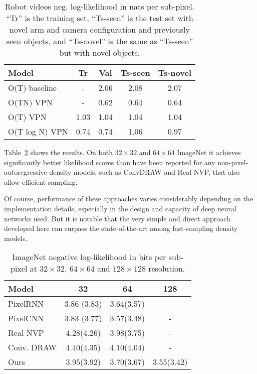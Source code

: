 \documentclass{article}
\begin{document}
\begin{table}[t!]
\begin{center}
\begin{tabular}{| l | c | c | c | c |}
\hline
\textbf{Model} & \textbf{Tr} & \textbf{Val} & \textbf{Ts-seen} & \textbf{Ts-novel} \\
\hline
\hline
O(T) baseline & - & 2.06 & 2.08 & 2.07 \\ \hline
O(TN) VPN & - & 0.62 & 0.64 & 0.64 \\ 
\hline
\hline
O(T) VPN & 1.03 & 1.04 & 1.04 & 1.04 \\ \hline
O(T log N) VPN & 0.74 & 0.74 & 1.06 & 0.97 \\ \hline
\end{tabular}
\end{center}
\vspace{-0.1in}
\caption{Robot videos neg. log-likelihood in nats per sub-pixel. ``Tr'' is the training set, ``Ts-seen'' is the test set with novel arm and camera configuration and previously seen objects, and ``Ts-novel'' is the same as ``Ts-seen'' but with novel objects.\label{tab:robot}}
\vspace{-0.1in}
\end{table}

Table~\ref{tab:imagenet} shows the results.
On both $32 \times 32$ and $64 \times 64$ ImageNet it achieves significantly better likelihood scores than have been reported for any non-pixel-autoregressive density models, such as ConvDRAW and Real NVP, that also allow efficient sampling.


Of course, performance of these approaches varies considerably depending on the implementation details, especially in the design and capacity of deep neural networks used.
But it is notable that the very simple and direct approach developed here can surpass the state-of-the-art among fast-sampling density models.



\begin{table}[h!]
\begin{center}
\begin{tabular}{| l | c | c | c |}
\hline
\textbf{Model} & \textbf{32} & \textbf{64} & \textbf{128} \\
\hline
\hline
PixelRNN & 3.86 (3.83) & 3.64(3.57) & - \\ \hline
PixelCNN & 3.83 (3.77) & 3.57(3.48) & - \\ \hline
\hline
Real NVP & 4.28(4.26) & 3.98(3.75) & - \\ \hline
Conv. DRAW & 4.40(4.35) & 4.10(4.04) & - \\
\hline
\hline
Ours & 3.95(3.92) & 3.70(3.67) & 3.55(3.42) \\ \hline
\end{tabular}
\end{center}
\vspace{-0.15in}
\caption{ImageNet negative log-likelihood in bits per sub-pixel at $32 \times 32$, $64 \times 64$ and $128 \times 128$ resolution.\label{tab:imagenet}}
\end{table}
\end{document}
